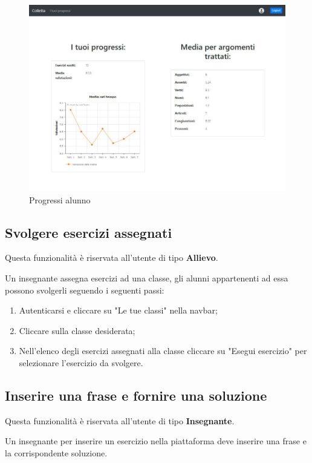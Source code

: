 \documentclass[11pt,a4paper]{article}
\begin{document}
{	\newpage
	\begin{figure}[h]
		\centering
		\includegraphics[scale=0.65]{images/progressi.jpg}
		\caption{Progressi alunno}
	\end{figure}	
	
	\subsection{Svolgere esercizi assegnati}
	Questa funzionalità è riservata all'utente di tipo \textbf{Allievo}.
	
	Un insegnante assegna esercizi ad una classe, gli alunni appartenenti ad essa possono svolgerli seguendo i seguenti passi:
	
	\begin{enumerate}
		\item Autenticarsi e cliccare su "Le tue classi" nella navbar;
		\item Cliccare sulla classe desiderata;
		\item Nell'elenco degli esercizi assegnati alla classe cliccare su "Esegui esercizio" per selezionare l'esercizio da svolgere.
	\end{enumerate}
		
	\subsection{Inserire una frase e fornire una soluzione}
		Questa funzionalità è riservata all'utente di tipo \textbf{Insegnante}.
		
		Un insegnante per inserire un esercizio nella piattaforma deve inserire una frase e la corrispondente soluzione.
		
}
\end{document}
